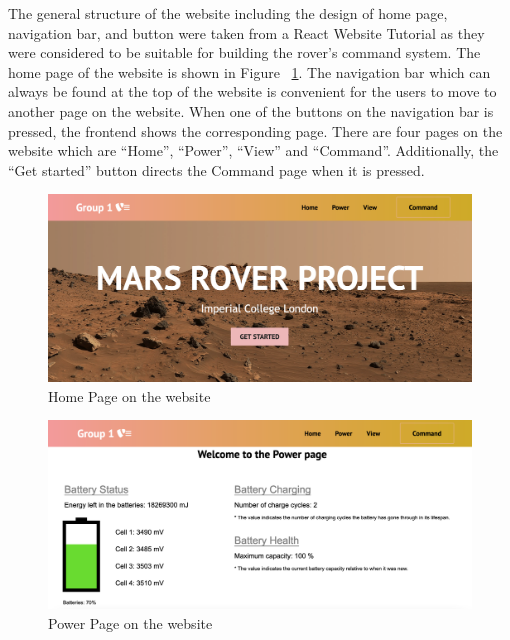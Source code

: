 \documentclass[a4paper]{article}
\begin{document}
The general structure of the website including the design of home page, navigation bar, and button 
were taken from a React Website Tutorial \cite{ReactTutorial} as they were considered to be suitable 
for building the rover’s command system. The home page of the website is shown in Figure ~\ref{fig:homepage}. The 
navigation bar which can always be found at the top of the website is convenient for the users to 
move to another page on the website. When one of the buttons on the navigation bar is pressed, the 
frontend shows the corresponding page. There are four pages on the website which are “Home”, “Power”, 
“View” and “Command”. Additionally, the “Get started” button directs the Command page when it is pressed. 

\begin{figure}[H]
	\begin{Center}
		\includegraphics[width = \linewidth]{./images/HomePage.png}
		\caption{Home Page on the website}
        \label{fig:homepage}
	\end{Center}
\end{figure}

\begin{figure}[H]
	\begin{Center}
		\includegraphics[width = \linewidth]{./images/PowerPage.png}
		\caption{Power Page on the website}
        \label{fig:powerpage}
	\end{Center}
\end{figure}
\end{document}
